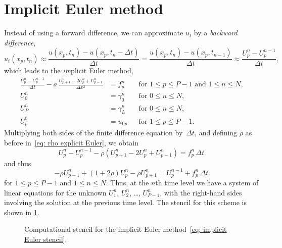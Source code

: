 \section{Implicit Euler method}

Instead of using a forward difference, we can approximate $u_t$ by a 
\emph{backward difference},
\[
u_t(x_p,t_n)\approx\frac{u(x_p,t_n)-u(x_p,t_n-\Delta t)}{\Delta t}
	=\frac{u(x_p,t_n)-u(x_p,t_{n-1})}{\Delta t}
	\approx\frac{U^n_p-U^{n-1}_p}{\Delta t},
\]
which leads to the \emph{im}plicit Euler method,
\begin{equation}\label{eq: implicit Euler 1d}
\begin{aligned}
\frac{U^n_p-U^{n-1}_p}{\Delta t}
	-a\,\frac{U^n_{p+1}-2U^n_p+U^n_{p-1}}{\Delta x^2}&=f^n_p&
&\text{for $1\le p\le P-1$ and $1\le n\le N$,}\\
U^n_0&=\gamma_0^n&&\text{for $0\le n\le N$,}\\
U^n_P&=\gamma_L^n&&\text{for $0\le n\le N$,}\\
U^0_p&=u_{0p}&&\text{for $1\le p\le P-1$.}
\end{aligned}
\end{equation}
Multiplying both sides of the finite difference equation by~$\Delta t$, and 
defining $\rho$ as before in~\eqref{eq: rho explicit Euler}, we obtain
\[
U^n_p-U^{n-1}_p-\rho(U^n_{p+1}-2U^n_p+U^n_{p-1})=f^n_p\,\Delta t
\]
and thus
\begin{equation}\label{eq: implicit Euler stencil}
-\rho U^n_{p-1}+(1+2\rho)U^n_p-\rho U^n_{p+1}=U^{n-1}_p+f^n_p\,\Delta t
\end{equation}
for $1\le p\le P-1$ and $1\le n\le N$.  Thus, at the $n$th time level we have a 
system of linear equations for the unknown $U^n_1$, $U^n_2$, \dots, $U^n_{P-1}$,
with the right-hand sides involving the solution at the previous time level.
The stencil for this scheme is shown in \cref{fig: implicit Euler stencil}.

\begin{figure}
\caption{Computational stencil for the implicit Euler 
method~\eqref{eq: implicit Euler stencil}.}
\label{fig: implicit Euler stencil}
\begin{center}
\end{center}
\end{figure}

